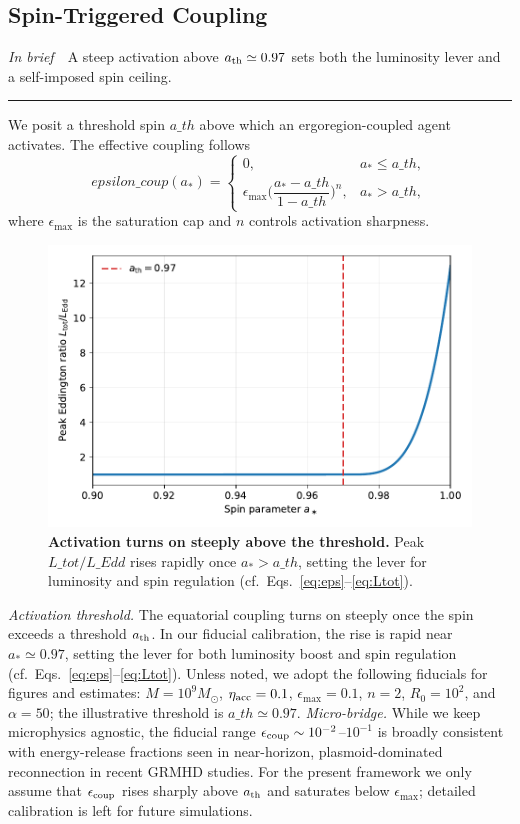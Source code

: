 \documentclass[twocolumn]{aastex701}
\newcommand{\ath}{a_{\rm th}}
\newcommand{\rg}{r_g}
\newcommand{\LEdd}{L_{\rm Edd}}
\newcommand{\Ltot}{L_{\rm tot}}
\newcommand{\FeKa}{\mathrm{Fe\,K}\alpha}
\newcommand{\epscoup}{\epsilon_{\rm coup}}
\newcommand{\aeq}{a_{\rm eq}}
\DeclareRobustCommand{\tldr}[1]{%
  \noindent\textit{In brief}\ \textemdash\ #1%
  \par\smallskip
  \noindent\rule{\columnwidth}{0.2pt}\par\medskip
}
\def\ath{a\_th}\def\rg{r\_g}\def\LEdd{L\_Edd}\def\Ltot{L\_tot}\def\FeKa{Fe K\string\alpha}%
\def\epscoup{epsilon\_coup}\def\aeq{a\_eq}\def\mathrm#1{#1}%
\begin{document}
\subsection{Spin-Triggered Coupling}\label{sec:coupling}
\tldr{A steep activation above $a_{\rm th}\simeq0.97$ sets both the luminosity lever and a self-imposed spin ceiling.}
We posit a threshold spin $\ath$ above which an ergoregion-coupled agent activates. The effective coupling follows
\begin{equation}
\epscoup(a_\ast)=
\begin{cases}
0, & a_\ast\le \ath,\\[3pt]
\epsilon_{\max}\Big(\dfrac{a_\ast-\ath}{1-\ath}\Big)^{n}, & a_\ast>\ath,
\end{cases}
\label{eq:eps}
\end{equation}
where $\epsilon_{\max}$ is the saturation cap and $n$ controls activation sharpness.
\begin{figure}[!htbp]
  \centering
  \includegraphics[width=.92\linewidth]{Fig_Onset.pdf}
\caption{\textbf{Activation turns on steeply above the threshold.}
Peak $\Ltot/\LEdd$ rises rapidly once $a_\ast\!>\!\ath$, setting the lever for luminosity and spin regulation (cf.\ Eqs.~\eqref{eq:eps}--\eqref{eq:Ltot}).}
  \label{fig:onset}
\end{figure}
\noindent\textit{Activation threshold.}
The equatorial coupling turns on steeply once the spin exceeds a threshold \(a_{\rm th}\).
In our fiducial calibration, the rise is rapid near \(a_\ast \simeq 0.97\), setting the lever for both luminosity boost and spin regulation (cf.\ Eqs.~\eqref{eq:eps}--\eqref{eq:Ltot}).
\FloatBarrier
Unless noted, we adopt the following fiducials for figures and estimates: $M=10^9M_\odot$, $\eta_{\rm acc}=0.1$, $\epsilon_{\max}=0.1$, $n=2$, $R_0=10^2$, and $\alpha=50$; the illustrative threshold is $\ath\simeq0.97$.
\noindent\emph{Micro-bridge.}
While we keep microphysics agnostic, the fiducial range
$\epsilon_{\rm coup}\sim10^{-2}$--$10^{-1}$ is broadly consistent with
energy-release fractions seen in near-horizon, plasmoid-dominated
reconnection in recent GRMHD studies. For the present framework we only
assume that $\epsilon_{\rm coup}$ rises sharply above $a_{\rm th}$ and
saturates below $\epsilon_{\max}$; detailed calibration is left for
future simulations.
\end{document}
